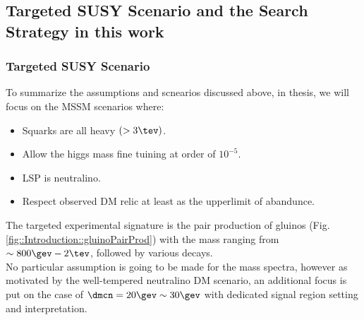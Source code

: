 





\subsection{Targeted SUSY Scenario and the Search Strategy in this work} 
\subsubsection{Targeted SUSY Scenario }
To summarize the assumptions and scnearios discussed above, in thesis, we will focus on the MSSM scenarios where:
\begin{itemize}
 \item Squarks are all heavy $(>3\tev)$.
 \item Allow the higgs mass fine tuining at order of $10^{-5}$.
 \item LSP is neutralino.
 \item Respect observed DM relic at least as the upperlimit of abandunce.
\end{itemize}

The targeted experimental signature is the pair production of gluinos (Fig. \ref{fig::Introduction::gluinoPairProd}) with the mass ranging from $\sim 800\gev-2\tev$, followed by various decays. \\
No particular assumption is going to be made for the mass spectra, however as motivated by the well-tempered neutralino DM scenario, an additional focus is put on the case of $\dmcn = 20\gev \sim 30\gev$ with dedicated signal region setting and interpretation.


